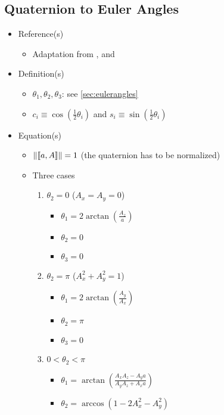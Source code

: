 \documentclass[letterpaper]{article}
\begin{document}
	\subsection{Quaternion to Euler Angles}
	\begin{itemize}
		\item Reference(s)
			\begin{itemize}
				\item Adaptation from \cite{Baker2008}, \cite{Rollett2008} and \cite{Wikipedia2008e}
			\end{itemize}
		\item Definition(s)
			\begin{itemize}
				\item $\theta_1, \theta_2, \theta_3$: see \ref{sec:eulerangles}
				\item $c_i \equiv \cos{\left(\frac{1}{2}\theta_i\right)}$ and $s_i \equiv \sin{\left(\frac{1}{2}\theta_i\right)}$
			\end{itemize}
		\item Equation(s)
			\begin{itemize}
				\item $\left\|\llbracket a, A \rrbracket\right\| = 1$ (the quaternion has to be normalized)
				\item Three cases
					\begin{enumerate}
						\item $\theta_2 = 0$ ($A_x = A_y = 0$)
							\begin{itemize}
								\item $\theta_1 = 2\arctan{\left(\frac{A_z}{a}\right)}$
								\item $\theta_2 = 0$
								\item $\theta_3 = 0$
							\end{itemize}
						\item $\theta_2 = \pi$ ($A_x^2 + A_y^2 = 1$)
							\begin{itemize}
								\item $\theta_1 = 2\arctan{\left(\frac{A_y}{A_x}\right)}$
								\item $\theta_2 = \pi$
								\item $\theta_3 = 0$
							\end{itemize}
						\item $0 < \theta_2 < \pi$
							\begin{itemize}
								\item $\theta_1 = \arctan{\left(\frac{A_xA_z - A_ya}{A_yA_z + A_xa}\right)}$
								\item $\theta_2 = \arccos{\left(1 - 2A_x^2 - A_y^2\right)}$

\end{itemize}
\end{enumerate}
\end{itemize}
\end{itemize}
\end{document}
